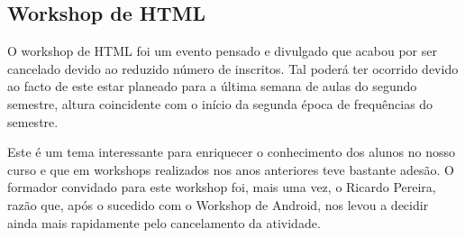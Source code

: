 
\subsection{Workshop de HTML}

O workshop de HTML foi um evento pensado e divulgado que acabou por ser cancelado devido ao reduzido número de inscritos. Tal poderá ter ocorrido devido ao facto de este estar planeado para a última semana de aulas do segundo semestre, altura coincidente com o início da segunda época de frequências do semestre.

Este é um tema interessante para enriquecer o conhecimento dos alunos no nosso curso e que em workshops realizados nos anos anteriores teve bastante adesão. O formador convidado para este workshop foi, mais uma vez, o Ricardo Pereira, razão que, após o sucedido com o Workshop de Android, nos levou a decidir ainda mais rapidamente pelo cancelamento da atividade.